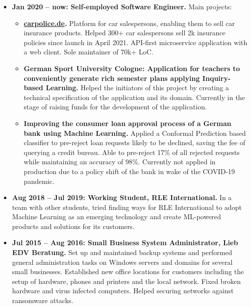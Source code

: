 \documentclass[10pt]{article}
\begin{document}
\begin{itemize}[label={}, leftmargin=*]

\item \textbf{Jan 2020 -- now: Self-employed Software Engineer.} Main
  projects:

  \begin{itemize}[label={}, leftmargin=*]
    \item \textbf{\href{https://carpolice.de}{carpolice.de}.}
      Platform for car salespersons, enabling them to sell car
      insurance products.
      Helped 300+ car salespersons sell 2k insurance policies since
      launch in April 2021.
      API-first microservice application with a web client.
      Sole maintainer of 70k+ LoC.

    \item \textbf{German Sport University Cologne: Application for
      teachers to conveniently generate rich semester plans applying
      Inquiry-based Learning.}
      Helped the initiators of this project by creating a technical
      specification of the application and its domain.
      Currently in the stage of raising funds for the development of
      the application.

    \item \textbf{Improving the consumer loan approval process of a
      German bank using Machine Learning.}
      Applied a Conformal Prediction based classifier to pre-reject
      loan requests likely to be declined, saving the fee of querying
      a credit bureau.
      Able to pre-reject 17\% of all rejected requests while
      maintaining an accuracy of 98\%.
      Currently not applied in production due to a policy shift of the
      bank in wake of the COVID-19 pandemic.
  \end{itemize}

\item \textbf{Aug 2018 -- Jul 2019: Working Student, RLE International.}
In a team with other students, tried finding ways for RLE
International to adopt Machine Learning as an emerging technology and
create ML-powered products and solutions for its customers.

\item \textbf{Jul 2015 -- Aug 2016: Small Business System Administrator,
Lieb EDV Beratung.}
Set up and maintained backup systems and performed general
administration tasks on Windows servers and domains for several small
businesses.
Established new office locations for customers including the setup of
hardware, phones and printers and the local network.
Fixed broken hardware and virus infected computers.
Helped securing networks against ransomware attacks.

\end{itemize}
\end{document}
